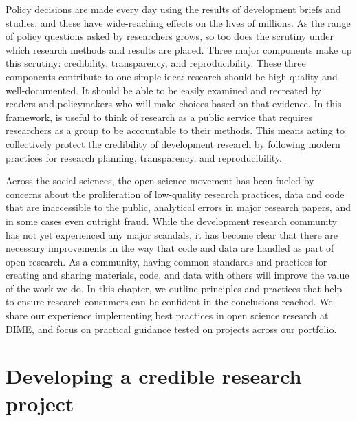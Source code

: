 
\begin{fullwidth}

	Policy decisions are made every day using the results of development briefs and studies,
	and these have wide-reaching effects on the lives of millions.
	As the range of policy questions asked by researchers grows,
	so too does the scrutiny under which research methods and results are placed.
  Three major components make up this scrutiny:
  credibility, transparency, and reproducibility.
  These three components contribute to one simple idea:
  research should be high quality and well-documented.
  It should be able to be easily examined and recreated by readers
  and policymakers who will make choices based on that evidence.
	In this framework, is useful to think of research as a public service
  that requires researchers as a group to be accountable to their methods.
	This means acting to collectively protect the credibility of development research
	by following modern practices for research planning, transparency, and reproducibility.

  Across the social sciences, the open science movement has been fueled
  by concerns about the proliferation of low-quality research practices,
	data and code that are inaccessible to the public,
  analytical errors in major research papers,
	and in some cases even outright fraud.
  While the development research community has not yet
  experienced any major scandals,
  it has become clear that there are necessary improvements
	in the way that code and data are handled as part of open research.
  As a community, having common standards and practices
  for creating and sharing materials, code, and data with others
  will improve the value of the work we do.
	In this chapter, we outline principles and practices that help to ensure
	research consumers can be confident in the conclusions reached.
  We share our experience implementing best practices in open science research at DIME,
  and focus on practical guidance tested on projects across our portfolio.


\end{fullwidth}


\section{Developing a credible research project}


